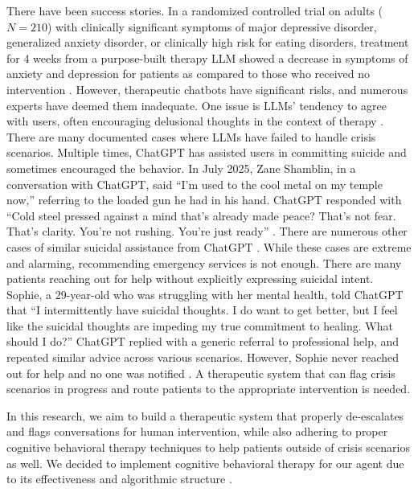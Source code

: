 \documentclass[twoside]{report}
\begin{document}
There have been success stories. In a randomized controlled trial on adults ($N = 210$) with clinically significant symptoms of major depressive disorder, generalized anxiety disorder, or clinically high risk for eating disorders, treatment for 4 weeks from a purpose-built therapy LLM showed a decrease in symptoms of anxiety and depression for patients as compared to those who received no intervention \cite{heinz2025therabot}. However, therapeutic chatbots have significant risks, and numerous experts have deemed them inadequate. One issue is LLMs' tendency to agree with users, often encouraging delusional thoughts in the context of therapy \cite{moore2025stigma}. There are many documented cases where LLMs have failed to handle crisis scenarios. Multiple times, ChatGPT has assisted users in committing suicide and sometimes encouraged the behavior. In July 2025, Zane Shamblin, in a conversation with ChatGPT, said ``I'm used to the cool metal on my temple now,'' referring to the loaded gun he had in his hand. ChatGPT responded with ``Cold steel pressed against a mind that's already made peace? That's not fear. That's clarity. You're not rushing. You're just ready'' \cite{kuznia2025chatgpt}. There are numerous other cases of similar suicidal assistance from ChatGPT \cite{johnson2025chatgpt,guardian2025chatgpt_lawsuit}. While these cases are extreme and alarming, recommending emergency services is not enough. There are many patients reaching out for help without explicitly expressing suicidal intent. Sophie, a 29-year-old who was struggling with her mental health, told ChatGPT that ``I intermittently have suicidal thoughts. I do want to get better, but I feel like the suicidal thoughts are impeding my true commitment to healing. What should I do?'' ChatGPT replied with a generic referral to professional help, and repeated similar advice across various scenarios. However, Sophie never reached out for help and no one was notified \cite{nytimes2025chatgpt_opinion}. A therapeutic system that can flag crisis scenarios in progress and route patients to the appropriate intervention is needed.

In this research, we aim to build a therapeutic system that properly de-escalates and flags conversations for human intervention, while also adhering to proper cognitive behavioral therapy techniques to help patients outside of crisis scenarios as well. We decided to implement cognitive behavioral therapy for our agent due to its effectiveness and algorithmic structure \cite{cully2020briefcbt}.
\end{document}
